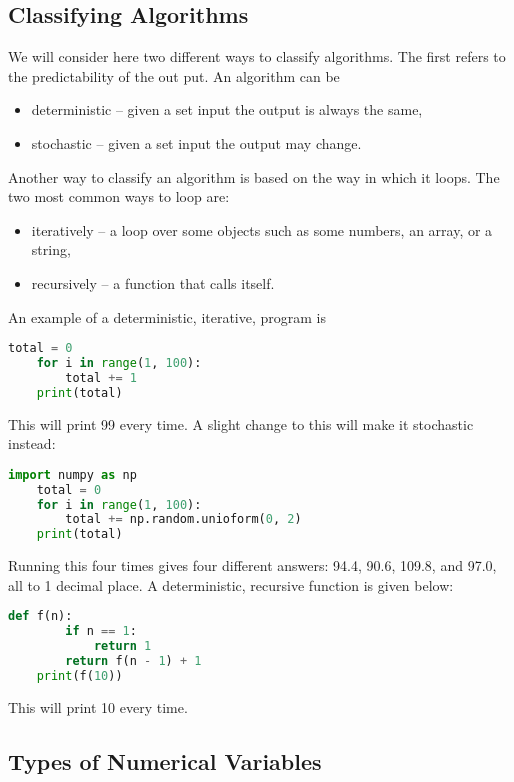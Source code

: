 \documentclass[a4paper]{article}
\begin{document}
    \subsection{Classifying Algorithms}
    We will consider here two different ways to classify algorithms.
    The first refers to the predictability of the out put.
    An algorithm can be
    \begin{itemize}
        \item deterministic -- given a set input the output is always the same,
        \item stochastic -- given a set input the output may change.
    \end{itemize}
    Another way to classify an algorithm is based on the way in which it loops.
    The two most common ways to loop are:
    \begin{itemize}
        \item iteratively -- a loop over some objects such as some numbers, an array, or a string,
        \item recursively -- a function that calls itself.
    \end{itemize}
    An example of a deterministic, iterative, program is
    \begin{lstlisting}[language=python]
    total = 0
    for i in range(1, 100):
        total += 1
    print(total)
    \end{lstlisting}
    This will print 99 every time.
    A slight change to this will make it stochastic instead:
    \begin{lstlisting}[language=python]
    import numpy as np
    total = 0
    for i in range(1, 100):
        total += np.random.unioform(0, 2)
    print(total)
    \end{lstlisting}
    Running this four times gives four different answers: 94.4, 90.6, 109.8, and 97.0, all to 1 decimal place.
    A deterministic, recursive function is given below:
    \begin{lstlisting}[language=python]
    def f(n):
        if n == 1:
            return 1
        return f(n - 1) + 1
    print(f(10))
    \end{lstlisting}
    This will print 10 every time.
    
    \subsection{Types of Numerical Variables}
\end{document}
